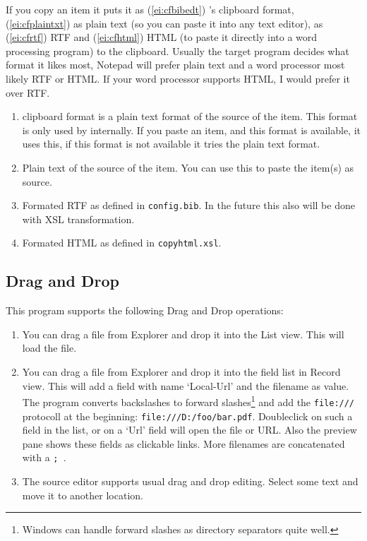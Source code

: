 \documentclass[oneside,10pt]{article}
\begin{document}
If you copy an item it puts it as (\ref{ei:cfbibedt}) \BibEdt{}'s clipboard
format, (\ref{ei:cfplaintxt}) as plain text (so you can paste it into any text
editor), as (\ref{ei:cfrtf}) RTF and (\ref{ei:cfhtml}) HTML
(to paste it directly into a word processing program) to the clipboard. Usually
the target program decides what format it likes most, Notepad will prefer plain
text and a word processor most likely RTF or HTML. If your word processor supports
HTML, I would prefer it over RTF.
\begin{enumerate}
  \item\label{ei:cfbibedt} \BibEdt{} clipboard format is a plain text format of
    the source of the item. This format is only used by \BibEdt{} internally. If
    you paste an item, and this format is available, it uses this, if this format
    is not available it tries the plain text format.
  \item\label{ei:cfplaintxt} Plain text of the source of the item. You can use this
    to paste the item(s) as \BibTeX{} source.
  \item\label{ei:cfrtf} Formated RTF as defined in \verb|config.bib|. In the future
    this also will be done with XSL transformation.
  \item\label{ei:cfhtml} Formated HTML as defined in \verb|copyhtml.xsl|.
\end{enumerate}

\subsection{Drag and Drop}
\label{sec:DragAndDrop}

This program supports the following Drag and Drop operations:
\begin{enumerate}
  \item You can drag a file from Explorer and drop it into the List view. This will
    load the file.
  \item You can drag a file from Explorer and drop it into the field list in
    Record view. This will add a field with name `Local-Url' and the filename as
    value. The program converts backslashes to forward slashes\footnote{Windows
    can handle forward slashes as directory separators quite well.} and add the \verb|file:///|
    protocoll at the beginning: \verb|file:///D:/foo/bar.pdf|. Doubleclick on such a field
    in the list, or on a `Url' field will open the file or URL. Also the preview
    pane shows these fields as clickable links. More filenames are concatenated
    with a \verb*|; |.
  \item The source editor supports usual drag and drop editing. Select some text
    and move it to another location.
\end{enumerate}
\end{document}

